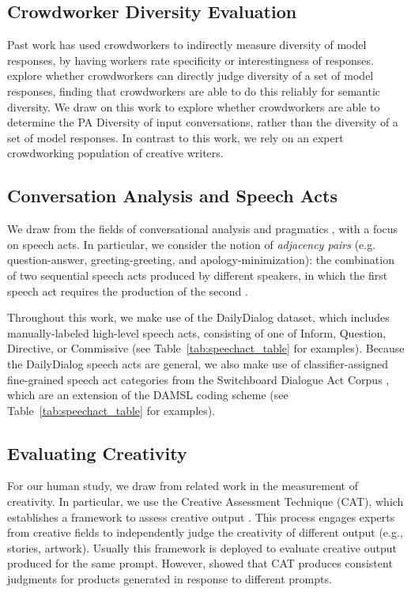 \documentclass[11pt]{article}
\newcommand{\edivshortspace}{PA Diversity }
\begin{document}
\subsection{Crowdworker Diversity Evaluation}
Past work has used crowdworkers to indirectly measure diversity of model responses, by having workers rate specificity \cite{li-etal-2016-diversity} or interestingness \cite{see-etal-2019-makes} of responses. 
\citet{tevet-berant-2021-evaluating} explore whether crowdworkers can  directly judge diversity of a set of model responses, finding that crowdworkers are able to do this reliably for semantic diversity.
 We draw on this work to explore whether crowdworkers are able to determine the \edivshortspace of input conversations, rather than the diversity of a set of model responses.  In contrast to this work, we rely on an expert crowdworking population of creative writers.

\subsection{Conversation Analysis and Speech Acts}

We  draw from the fields of conversational analysis \cite{schegloff} and pragmatics \cite{levinson_1983}, with a focus on speech acts.  In particular, we consider the notion of \textit{adjacency pairs} (e.g. question-answer, greeting-greeting, and apology-minimization): the combination of two sequential speech acts produced by different speakers, in which the first speech act requires the production of the second \cite{levinson_1983}.  

Throughout this work, we make use of the DailyDialog dataset, which includes manually-labeled high-level speech acts, consisting of one of Inform, Question, Directive, or Commissive \cite{li-etal-2017-dailydialog} (see Table~\ref{tab:speechact_table} for examples). 
Because the DailyDialog speech acts are general, we also make use of classifier-assigned fine-grained speech act categories from the
Switchboard Dialogue Act Corpus \cite{Jurafsky-etal:1997}, which are an extension of the DAMSL coding scheme \cite{core1997} (see Table~\ref{tab:speechact_table} for examples).  


\subsection{Evaluating Creativity}\label{sec:creativity}
For our human study, we draw from related work in the measurement of creativity. 
In particular, we use the Creative Assessment Technique (CAT), which establishes a framework to assess creative output \cite{amabile}.  
This process engages experts from  creative fields to independently judge the creativity of different output (e.g., stories, artwork). Usually this framework is deployed to evaluate creative output produced for the same prompt.  However, \citet{baer} showed that CAT produces  consistent judgments for 
products generated in response to different prompts.  
\end{document}
